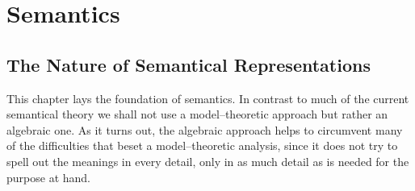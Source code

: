 \chapter{Semantics}
\thispagestyle{empty}
\label{kap6}
\section{The Nature of Semantical Representations}
\label{kap6-1}
\label{kap:feasibility}
%
%
This chapter lays the foundation of semantics. In contrast
to much of the current semantical theory we shall not use
a model--theoretic approach but rather an algebraic one.
As it turns out, the algebraic approach helps to circumvent
many of the difficulties that beset a model--theoretic analysis,
since it does not try to spell out the meanings in every detail,
only in as much detail as is needed for the purpose at hand.

